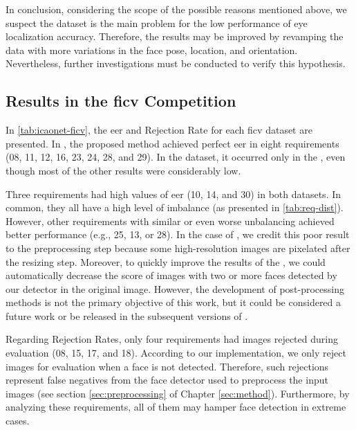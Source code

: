 In conclusion, considering the scope of the possible reasons mentioned above, we suspect the dataset is the main problem for the low performance of eye localization accuracy. Therefore, the results may be improved by revamping the data with more variations in the face pose, location, and orientation. Nevertheless, further investigations must be conducted to verify this hypothesis.
 
 
\subsection{Results in the \acs{ficv} Competition} \label{sec:ficv_results}
 
In \autoref{tab:icaonet-ficv}, the \acl{eer} and Rejection Rate for each \acs{ficv} dataset are presented. In \ficvtest, the proposed method achieved perfect \acs{eer} in eight requirements (08, 11, 12, 16, 23, 24, 28, and 29). In the \ficvofficial dataset, it occurred only in the \veiloverface, even though most of the other results were considerably low. 
 

 
Three requirements had high values of \acs{eer} (10, 14, and 30) in both datasets. In common, they all have a high level of imbalance (as presented in \autoref{tab:req-dist}). However, other requirements with similar or even worse unbalancing achieved better performance (e.g., 25, 13, or 28). In the case of \pixelation, we credit this poor result to the preprocessing step because some high-resolution images are pixelated after the resizing step. Moreover, to quickly improve the results of the \otherfacesortoys, we could automatically decrease the score of images with two or more faces detected by our detector in the original image. However, the development of post-processing methods is not the primary objective of this work, but it could be considered a future work or be released in the subsequent versions of \methodname.
 
Regarding Rejection Rates, only four requirements had images rejected during evaluation (08, 15, 17, and 18). According to our implementation, we only reject images for evaluation when a face is not detected. Therefore, such rejections represent false negatives from the face detector used to preprocess the input images (see section \ref{sec:preprocessing} of Chapter \ref{sec:method}). Furthermore, by analyzing these requirements, all of them may hamper face detection in extreme cases. 
 
